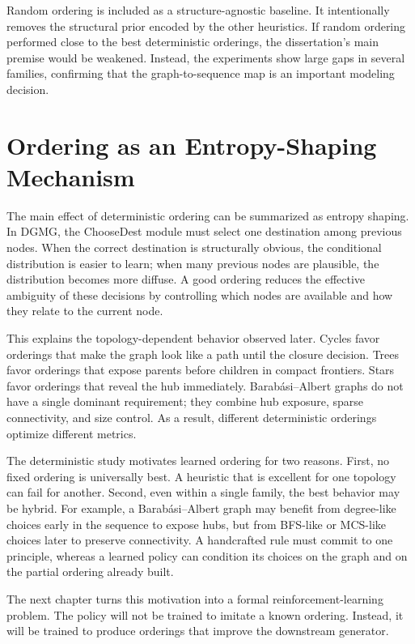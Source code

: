 Random ordering is included as a structure-agnostic baseline. It intentionally removes the structural prior encoded by the other heuristics. If random ordering performed close to the best deterministic orderings, the dissertation's main premise would be weakened. Instead, the experiments show large gaps in several families, confirming that the graph-to-sequence map is an important modeling decision.

\section{Ordering as an Entropy-Shaping Mechanism}
\label{sec:ordering-entropy}

The main effect of deterministic ordering can be summarized as entropy shaping. In DGMG, the ChooseDest module must select one destination among previous nodes. When the correct destination is structurally obvious, the conditional distribution is easier to learn; when many previous nodes are plausible, the distribution becomes more diffuse. A good ordering reduces the effective ambiguity of these decisions by controlling which nodes are available and how they relate to the current node.

This explains the topology-dependent behavior observed later. Cycles favor orderings that make the graph look like a path until the closure decision. Trees favor orderings that expose parents before children in compact frontiers. Stars favor orderings that reveal the hub immediately. Barab\'asi--Albert graphs do not have a single dominant requirement; they combine hub exposure, sparse connectivity, and size control. As a result, different deterministic orderings optimize different metrics.

The deterministic study motivates learned ordering for two reasons. First, no fixed ordering is universally best. A heuristic that is excellent for one topology can fail for another. Second, even within a single family, the best behavior may be hybrid. For example, a Barab\'asi--Albert graph may benefit from degree-like choices early in the sequence to expose hubs, but from BFS-like or MCS-like choices later to preserve connectivity. A handcrafted rule must commit to one principle, whereas a learned policy can condition its choices on the graph and on the partial ordering already built.

The next chapter turns this motivation into a formal reinforcement-learning problem. The policy will not be trained to imitate a known ordering. Instead, it will be trained to produce orderings that improve the downstream generator.
